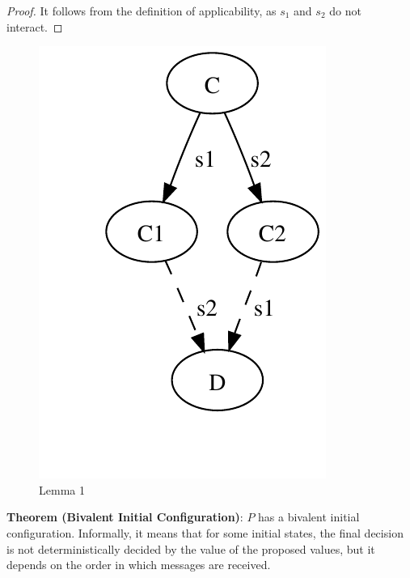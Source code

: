 \documentclass[12pt]{article}
\newenvironment{lemma}[1]{\textbf{Theorem (#1)}: }{\medskip}
\begin{document}
\begin{proof}
It follows from the definition of applicability, as $s_1$ and $s_2$ do not
interact.
\end{proof}

\begin{figure}
\begin{center}
\includegraphics{figs/06/consensus-fig1.pdf}
\end{center}
\caption{Lemma 1}
\end{figure}


\newpage
\begin{lemma}{Bivalent Initial Configuration}
$P$ has a bivalent initial configuration. 
%
Informally, it means that for some initial
states, the final decision is not deterministically decided by 
the value of the proposed values, but it depends on the order
in which messages are received.
\end{lemma}
\end{document}
